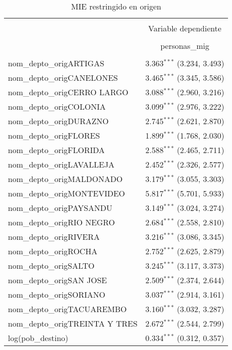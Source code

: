 
\begin{table}[H] \centering 
  \caption{MIE restringido en origen} 
  \label{} 
\begin{tabular}{@{\extracolsep{5pt}}lc} 
\\[-1.8ex]\hline 
\hline \\[-1.8ex] 
 & \multicolumn{1}{c}{Variable dependiente} \\ 
\cline{2-2} 
\\[-1.8ex] & personas\_mig \\ 
\hline \\[-1.8ex] 
 nom\_depto\_origARTIGAS & 3.363$^{***}$ (3.234, 3.493) \\ 
  nom\_depto\_origCANELONES & 3.465$^{***}$ (3.345, 3.586) \\ 
  nom\_depto\_origCERRO LARGO & 3.088$^{***}$ (2.960, 3.216) \\ 
  nom\_depto\_origCOLONIA & 3.099$^{***}$ (2.976, 3.222) \\ 
  nom\_depto\_origDURAZNO & 2.745$^{***}$ (2.621, 2.870) \\ 
  nom\_depto\_origFLORES & 1.899$^{***}$ (1.768, 2.030) \\ 
  nom\_depto\_origFLORIDA & 2.588$^{***}$ (2.465, 2.711) \\ 
  nom\_depto\_origLAVALLEJA & 2.452$^{***}$ (2.326, 2.577) \\ 
  nom\_depto\_origMALDONADO & 3.179$^{***}$ (3.055, 3.303) \\ 
  nom\_depto\_origMONTEVIDEO & 5.817$^{***}$ (5.701, 5.933) \\ 
  nom\_depto\_origPAYSANDU & 3.149$^{***}$ (3.024, 3.274) \\ 
  nom\_depto\_origRIO NEGRO & 2.684$^{***}$ (2.558, 2.810) \\ 
  nom\_depto\_origRIVERA & 3.216$^{***}$ (3.086, 3.345) \\ 
  nom\_depto\_origROCHA & 2.752$^{***}$ (2.625, 2.879) \\ 
  nom\_depto\_origSALTO & 3.245$^{***}$ (3.117, 3.373) \\ 
  nom\_depto\_origSAN JOSE & 2.509$^{***}$ (2.374, 2.644) \\ 
  nom\_depto\_origSORIANO & 3.037$^{***}$ (2.914, 3.161) \\ 
  nom\_depto\_origTACUAREMBO & 3.160$^{***}$ (3.032, 3.287) \\ 
  nom\_depto\_origTREINTA Y TRES & 2.672$^{***}$ (2.544, 2.799) \\ 
  log(pob\_destino) & 0.334$^{***}$ (0.312, 0.357) \\ 

\end{tabular}
\end{table}
